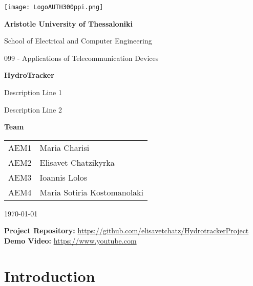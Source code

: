 \documentclass{article}
\begin{document}
\begin{titlepage}
    \centering
    \texttt{[image: LogoAUTH300ppi.png]}
    \par\vspace{2cm}

    {\Large \textbf{Aristotle University of Thessaloniki} \par}
    \vspace{0.5cm}
    {\large School of Electrical and Computer Engineering\par}
    {\large 099 - Applications of Telecommunication Devices\par}
    \vspace{3cm}

    {\Large \textbf{HydroTracker} \par}
    {\large Description Line 1 \par}
    {\large Description Line 2 \par}
    \vspace{3cm}

    {\large \textbf{Team} \par}
    \vspace{0.5cm}
    \begin{tabular}{ll}
    AEM1 & Maria Charisi \\
    AEM2 & Elisavet Chatzikyrka \\
    AEM3 & Ioannis Lolos\\
    AEM4 & Maria Sotiria Kostomanolaki \\
    \end{tabular}
    \par\vspace{3cm}

    {\today \par}

    \bigskip
    \noindent
    \textbf{Project Repository:} \url{https://github.com/elisavetchatz/HydrotrackerProject} \\
    \textbf{Demo Video:} \url{https://www.youtube.com}

\end{titlepage}

\tableofcontents 

\newpage 

\section{Introduction}

\end{document}
